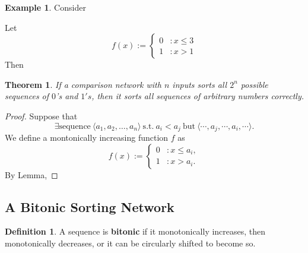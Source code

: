 \documentclass[12pt,openany]{book}
\newtheorem{theorem}{Theorem}[chapter]
\theoremstyle{definition}
\newtheorem{definition}{Definition}[chapter]
\newtheorem{example}{Example}[chapter]
\begin{document}
	\begin{example}
		Consider \begin{center}
		\end{center}
		Let \[
		f(x):=\begin{cases}
			0 &:x\leq 3\\
			1 &:x> 1
		\end{cases}
		\] Then \begin{center}
		\end{center}
	\end{example}
	\vspace{8pt}
	\begin{tcolorbox}[colframe=thmcolor,title={\color{white}\bf Zero-One Principle}]
		\begin{theorem}
			If a comparison network with \(n\) inputs sorts all \(2^n\) possible sequences of \(0\)'s and \(1's\), then it sorts all sequences of arbitrary numbers correctly.
		\end{theorem}
	\end{tcolorbox}
	\begin{proof}
		Suppose that \[
		\exists\text{sequence}\ \langle a_1,a_2,\dots,a_n\rangle\ \text{s.t.}\ a_i<a_j\ \text{but}\ \langle \cdots,a_j,\cdots,a_i,\cdots\rangle.
		\] We define a montonically increasing function \(f\) as \[
		f(x):=\begin{cases}
			0&:x\leq a_i,\\
			1&:x> a_i.
		\end{cases}
		\] By Lemma,
	\end{proof}

	\newpage
	\subsection{A Bitonic Sorting Network}
	\begin{tcolorbox}[colframe=defcolor,title={\color{white}\bf Bitonic}]
		\begin{definition}
			A sequence is \textbf{bitonic} if it monotonically increases, then monotonically decreases, or it can be circularly shifted to become so.
		\end{definition}
	\end{tcolorbox}
	\vspace{20pt}
	
\end{document}
